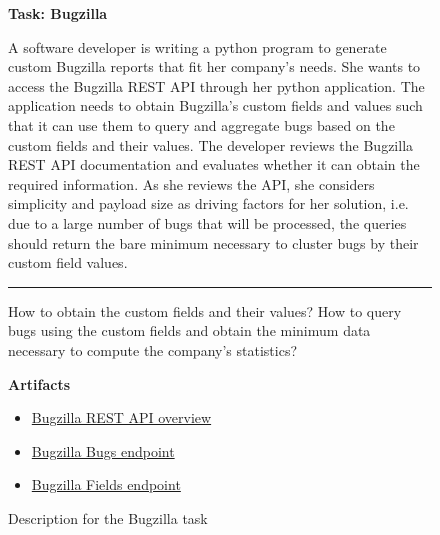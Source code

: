 \begin{figure}
\begin{mdframed}[backgroundcolor=gray!05] 
\begin{scriptsize}

{\large \textbf{Task: Bugzilla}} \bigskip


A software developer is writing a python program to generate custom Bugzilla reports that fit her company's needs. She wants to access the Bugzilla REST API through her python application.
The application needs to obtain Bugzilla's custom fields and values such that it can use them to query and aggregate bugs based on the custom fields and their values. The developer reviews the Bugzilla REST API documentation and evaluates whether it can obtain the required information. As she reviews the API, she considers simplicity and payload size as driving factors for her solution, i.e. due to a large number of bugs that will be processed, the queries should return the bare minimum necessary to cluster bugs by their custom field values.


\begin{center}
\rule{10cm}{0.4pt}
\end{center}

How to obtain the custom fields and their values? How to query bugs using the custom
fields and obtain the minimum data necessary to compute the company's statistics?

\medskip

\textbf{Artifacts}

\begin{itemize}
    \item \href{https://bugzilla.readthedocs.io/en/latest/api/core/v1/general.html}{Bugzilla REST API overview}
    \item \href{https://bugzilla.readthedocs.io/en/latest/api/core/v1/bug.html}{Bugzilla Bugs endpoint}
    \item \href{https://bugzilla.readthedocs.io/en/latest/api/core/v1/field.html}{Bugzilla Fields endpoint}
\end{itemize}

\end{scriptsize}
\end{mdframed}
\caption{Description for the Bugzilla task}
\end{figure}

    

